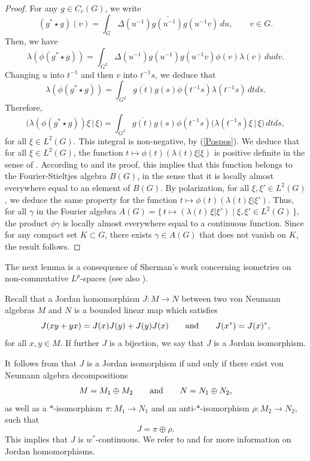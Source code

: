 \documentclass[12pt]{amsart}
\theoremstyle{remark}
\theoremstyle{definition}
\numberwithin{equation}{section}
\begin{document}
\begin{proof}
For any $g\in C_c(G)$, we write
$$
(g^*\star g)(v) = \int_G \Delta(u^{-1})\overline{g(u^{-1})} g(u^{-1}v)\, du,\qquad v\in G.
$$
Then, we have 
$$
\lambda(\phi(g^* \star g)) = \int_{G^2}\Delta(u^{-1})\overline{g(u^{-1})} 
g(u^{-1}v)\phi(v)\lambda(v)\, dudv.
$$
Changing $u$ into $t^{-1}$ and then $v$ into $t^{-1}s$, we deduce that
$$
\lambda(\phi(g^* \star g)) = \int_{G^2} \overline{g(t)}g(s)
\phi(t^{-1}s) \lambda(t^{-1}s)\,dtds.
$$
Therefore,
$$
\bigl(\lambda(\phi(g^* \star g)) \xi\,
\big\vert\,\xi\bigr) = 
\int_{G^2} \overline{g(t)}g(s)
\phi(t^{-1}s) \bigl(\lambda(t^{-1}s) 
\xi\,
\vert\, \xi\bigr)  \,dtds, 
$$
for all $\xi\in L^2(G).$
This integral is non-negative, by (\ref{Pospos}). 
We deduce that for all $\xi\in L^2(G)$,  the function
$t\mapsto \phi(t)(\lambda(t)\xi\vert\xi)$ is positive definite
in the sense of \cite[Definition VII.3.20]{Tak2}. According to 
\cite[Proposition VII.3.21]{Tak2} and its proof, this implies that 
this function belongs to the Fourier-Stieltjes algebra $B(G)$, in the sense that
it is locally almost everywhere equal to an element of $B(G)$.
By polarization, for all $\xi,\xi'\in L^2(G)$, we deduce the same property for the function 
$t\mapsto \phi(t)(\lambda(t)\xi\vert\xi')$. Thus, for all $\gamma$ in the Fourier algebra $A(G) = \{\, t \mapsto ( 
\lambda(t)\,\xi\vert \xi' ) \mid \xi, \xi' \in L^2(G) \,\}$,
the product $\phi\gamma$ is locally almost everywhere 
equal to a continuous function.
Since for any compact set $K\subset G$, there exists $\gamma\in A(G)$ that does not vanish on 
$K$, the result follows.
\end{proof}

The next lemma  is a consequence of Sherman's work
concerning  isometries
on non-commutative $L^p$-spaces \cite{Sh} (see also \cite{Sh2}).

Recall that a Jordan homomorphism $J\colon M\to N$ between two
von Neumann algebras $M$ and $N$  is a bounded linear map which satisfies
\begin{equation}\label{5Jordan}
J(xy+yx)=J(x)J(y)+ J(y)J(x)
\qquad\hbox{and}\qquad
J(x^*)=J(x)^*,
\end{equation}
for all $x,y\in M$. If further $J$ is a bijection, we say that 
$J$ is a Jordan isomorphism.

It follows from \cite[Theorem 3.3]{Sto} that $J$ is a Jordan isomorphism if and only if there exist
von Neumann  algebra decompositions 
\begin{equation}\label{5Decomp1}
M=M_1\oplus M_2
\qquad\hbox{and}\qquad
N=N_1\oplus N_2, 
\end{equation}
as well as a
$*$-isomorphism $\pi\colon M_1\to N_1$ and an anti-$*$-isomorphism
$\rho\colon M_2\to N_2$, such that 
\begin{equation}\label{5Decomp2}
J=\pi\oplus\rho.
\end{equation}
This implies that $J$ is $w^*$-continuous. We refer to \cite{HOS} and \cite[Exercices 10.5.21-10.5.31]{KR} 
for more information on Jordan homomorphisms.
\end{document}

